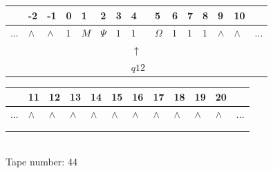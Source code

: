 \documentclass[11pt]{article}
\begin{document}
\begin{table}[H]
\centering
\begin{tabular}{lllllllllllllll}
 & -2 & -1 & 0 & 1 & 2 & 3 & 4 & 5 & 6 & 7 & 8 & 9 & 10 & \\
\hline
$...$ & \multicolumn{1}{|l|}{$\wedge$} & \multicolumn{1}{|l|}{$\wedge$} & \multicolumn{1}{|l|}{$1$} & \multicolumn{1}{|l|}{$M$} & \multicolumn{1}{|l|}{$\Psi$} & \multicolumn{1}{|l|}{$1$} & \multicolumn{1}{|l|}{$1$} & \multicolumn{1}{|l|}{$\Omega$} & \multicolumn{1}{|l|}{$1$} & \multicolumn{1}{|l|}{$1$} & \multicolumn{1}{|l|}{$1$} & \multicolumn{1}{|l|}{$\wedge$} & \multicolumn{1}{|l|}{$\wedge$} & $...$\\
\hline
&  &  &  &  &  &  & $\uparrow$ &  &  &  &  &  &  &  \\
&  &  &  &  &  &  & $ q12 $ &  &  &  &  &  &  &  \\
\end{tabular}
\begin{tabular}{llllllllllll}
 & 11 & 12 & 13 & 14 & 15 & 16 & 17 & 18 & 19 & 20 & \\
\hline
$...$ & \multicolumn{1}{|l|}{$\wedge$} & \multicolumn{1}{|l|}{$\wedge$} & \multicolumn{1}{|l|}{$\wedge$} & \multicolumn{1}{|l|}{$\wedge$} & \multicolumn{1}{|l|}{$\wedge$} & \multicolumn{1}{|l|}{$\wedge$} & \multicolumn{1}{|l|}{$\wedge$} & \multicolumn{1}{|l|}{$\wedge$} & \multicolumn{1}{|l|}{$\wedge$} & \multicolumn{1}{|l|}{$\wedge$} & $...$\\
\hline
&  &  &  &  &  &  &  &  &  &  &  \\
&  &  &  &  &  &  &  &  &  &  &  \\
\end{tabular}
\\
Tape number: 44
\noindent\makebox[\linewidth]{\hdashrule{\textwidth}{1pt}{1pt}}\end{table}
\end{document}
